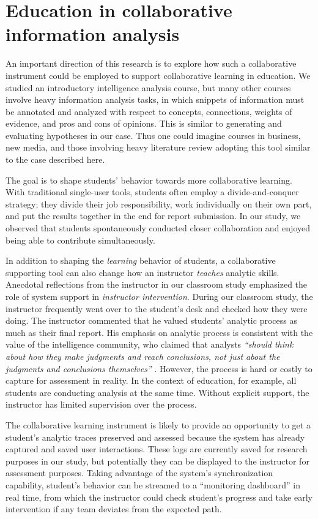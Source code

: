 \section{Education in collaborative information analysis}

An important direction of this research is to explore how such a collaborative instrument could be employed to support collaborative learning in education. We studied an introductory intelligence analysis course, but many other courses involve heavy information analysis tasks, in which snippets of information must be annotated and analyzed with respect to concepts, connections, weights of evidence, and pros and cons of opinions. This is similar to generating and evaluating hypotheses in our case. Thus one could imagine courses in business, new media, and those involving heavy literature review adopting this tool similar to the case described here.

The goal is to shape students' behavior towards more collaborative learning. With traditional single-user tools, students often employ a divide-and-conquer strategy; they divide their job responsibility, work individually on their own part, and put the results together in the end for report submission. In our study, we observed that students spontaneously conducted closer collaboration and enjoyed being able to contribute simultaneously.

In addition to shaping the \textit{learning} behavior of students, a collaborative supporting tool can also change how an instructor \textit{teaches} analytic skills. Anecdotal reflections from the instructor in our classroom study emphasized the role of system support in \textit{instructor intervention}. During our classroom study, the instructor frequently went over to the student's desk and checked how they were doing. The instructor commented that he valued students' analytic process as much as their final report. His emphasis on analytic process is consistent with the value of the intelligence community, who claimed that analysts \textit{``should think about how they make judgments and reach conclusions, not just about the judgments and conclusions themselves''} \citep{Heuer1999}. However, the process is hard or costly to capture for assessment in reality. In the context of education, for example, all students are conducting analysis at the same time. Without explicit support, the instructor has limited supervision over the process.

The collaborative learning instrument is likely to provide an opportunity to get a student's analytic traces preserved and assessed because the system has already captured and saved user interactions. These logs are currently saved for research purposes in our study, but potentially they can be displayed to the instructor for assessment purposes. Taking advantage of the system's synchronization capability, student's behavior can be streamed to a ``monitoring dashboard'' in real time, from which the instructor could check student's progress and take early intervention if any team deviates from the expected path.

